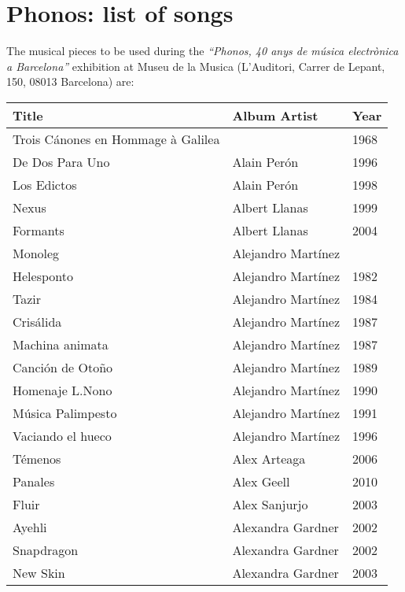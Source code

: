 \chapter{Phonos: list of songs} 

\label{AppendixC} 


The musical pieces to be used during the \textit{``Phonos, 40 anys de música electrònica a Barcelona''} exhibition at Museu de la Musica (L'Auditori, Carrer de Lepant, 150, 08013 Barcelona) are: 

\begin{center}
\begin{longtable}{| p{} | p{} | p{} |} 
\hline
\textbf{Title} & \textbf{Album Artist} & \textbf{Year} \\ \hline
Trois Cánones en Hommage à Galilea &  & 1968 \\ \hline 
De Dos Para Uno & Alain Perón & 1996 \\ \hline 
Los Edictos & Alain Perón & 1998 \\ \hline 
Nexus & Albert Llanas & 1999 \\ \hline 
Formants & Albert Llanas & 2004 \\ \hline 
Monoleg & Alejandro Martínez &  \\ \hline 
Helesponto & Alejandro Martínez & 1982 \\ \hline 
Tazir & Alejandro Martínez & 1984 \\ \hline 
Crisálida & Alejandro Martínez & 1987 \\ \hline 
Machina animata & Alejandro Martínez & 1987 \\ \hline 
Canción de Otoño & Alejandro Martínez & 1989 \\ \hline 
Homenaje L.Nono & Alejandro Martínez & 1990 \\ \hline 
Música Palimpesto & Alejandro Martínez & 1991 \\ \hline 
Vaciando el hueco & Alejandro Martínez & 1996 \\ \hline 
Témenos & Alex Arteaga & 2006 \\ \hline 
Panales & Alex Geell & 2010 \\ \hline 
Fluir & Alex Sanjurjo & 2003 \\ \hline 
Ayehli & Alexandra Gardner & 2002 \\ \hline 
Snapdragon & Alexandra Gardner & 2002 \\ \hline 
New Skin & Alexandra Gardner & 2003 \\ \hline 

\end{longtable}
\end{center}
